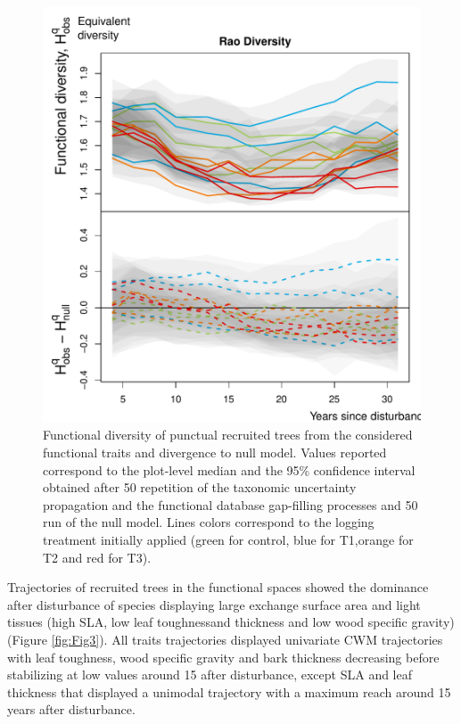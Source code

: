 \documentclass[fleqn,10pt]{ArtEcoFoG} %
\begin{document}
\begin{figure}

{\centering \includegraphics{RecruitmentTrajectories_files/figure-latex/Fig2-1} 

}

\caption{Functional diversity of punctual recruited trees from the considered functional traits and divergence to null model. Values reported correspond to the plot-level median and the 95\% confidence interval obtained after 50 repetition of the taxonomic uncertainty propagation and the functional database gap-filling processes and 50 run of the null model. Lines colors correspond to the logging treatment initially applied (green for control, blue for T1,orange for T2 and red for T3).}\label{fig:Fig2}
\end{figure}

Trajectories of recruited trees in the functional spaces showed the
dominance after disturbance of species displaying large exchange surface
area and light tissues (high SLA, low leaf toughnessand thickness and
low wood specific gravity) (Figure \ref{fig:Fig3}). All traits
trajectories displayed univariate CWM trajectories with leaf toughness,
wood specific gravity and bark thickness decreasing before stabilizing
at low values around 15 after disturbance, except SLA and leaf thickness
that displayed a unimodal trajectory with a maximum reach around 15
years after disturbance.
\end{document}
